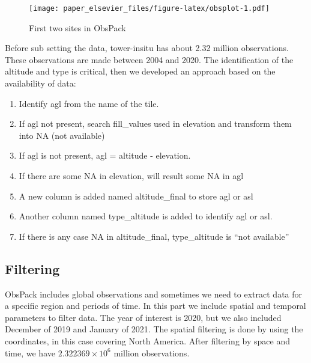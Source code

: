 \documentclass[preprint, 3p,
authoryear]{elsarticle} %
\providecommand{\tightlist}{%
  \setlength{\itemsep}{0pt}\setlength{\parskip}{0pt}}
\begin{document}
\begin{figure}
\centering
\texttt{[image: paper\_elsevier\_files/figure-latex/obsplot-1.pdf]}
\caption{First two sites in ObsPack}
\end{figure}

Before sub setting the data, tower-insitu has about 2.32 million
observations. These observations are made between 2004 and 2020. The
identification of the altitude and type is critical, then we developed
an approach based on the availability of data:

\begin{enumerate}
\def\labelenumi{\arabic{enumi}.}
\tightlist
\item
  Identify agl from the name of the tile.
\item
  If agl not present, search fill\_values used in elevation and
  transform them into NA (not available)
\item
  If agl is not present, agl = altitude - elevation.
\item
  If there are some NA in elevation, will result some NA in agl
\item
  A new column is added named altitude\_final to store agl or asl
\item
  Another column named type\_altitude is added to identify agl or asl.
\item
  If there is any case NA in altitude\_final, type\_altitude is ``not
  available''
\end{enumerate}

\hypertarget{filtering}{%
\subsection{Filtering}\label{filtering}}

ObsPack includes global observations and sometimes we need to extract
data for a specific region and periods of time. In this part we include
spatial and temporal parameters to filter data. The year of interest is
2020, but we also included December of 2019 and January of 2021. The
spatial filtering is done by using the coordinates, in this case
covering North America. After filtering by space and time, we have
\ensuremath{2.322369\times 10^{6}} million observations.
\end{document}

